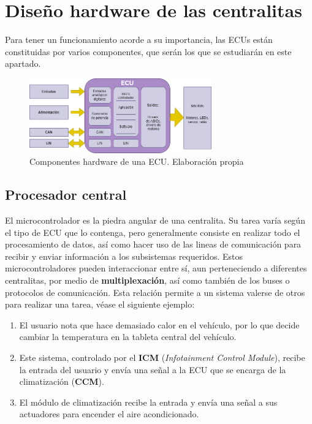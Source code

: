 \section{Diseño hardware de las centralitas}

Para tener un funcionamiento acorde a su importancia, las ECUs están constituidas por varios componentes, que serán los que se estudiarán en este apartado.

\begin{figure}[h]
    \centering
    \includegraphics[width=0.70\textwidth]{imagenes/ECU_hardware.png}
    \caption{Componentes hardware de una ECU. Elaboración propia}
\end{figure}

\subsection{Procesador central}
El microcontrolador es la piedra angular de una centralita. Su tarea varía según el tipo de ECU que lo contenga, pero generalmente consiste en realizar todo el procesamiento de datos, así como hacer uso de las lineas de comunicación para recibir y enviar información a los subsistemas requeridos. \newline
Estos microcontroladores pueden interaccionar entre sí, aun perteneciendo a diferentes centralitas, por medio de \textbf{multiplexación}, así como también de los buses o protocolos de comunicación. Esta relación permite a un sistema valerse de otros para realizar una tarea, véase el siguiente ejemplo: 

\begin{enumerate}
    \item El usuario nota que hace demasiado calor en el vehículo, por lo que decide cambiar la temperatura en la tableta central del vehículo.
    \item Este sistema, controlado por el \textbf{ICM} (\textit{Infotainment Control Module}), recibe la entrada del usuario y envía una señal a la ECU que se encarga de la climatización (\textbf{CCM}).
    \item El módulo de climatización recibe la entrada y envía una señal a sus actuadores para encender el aire acondicionado.
\end{enumerate}


